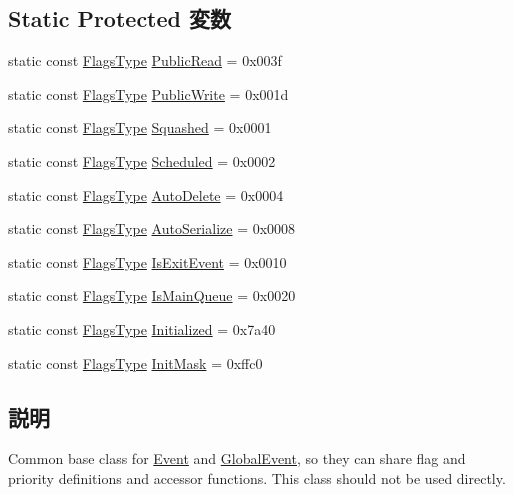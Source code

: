 \subsection*{Static Protected 変数}
\begin{DoxyCompactItemize}
\item 
static const \hyperlink{classEventBase_ad01d22e048b90a29dcd44109f5fc4c5e}{FlagsType} \hyperlink{classEventBase_a7e97bb94f1684b43dd97c646cfdeefd7}{PublicRead} = 0x003f
\item 
static const \hyperlink{classEventBase_ad01d22e048b90a29dcd44109f5fc4c5e}{FlagsType} \hyperlink{classEventBase_afabddde79b1b676b2e1738700aaf08af}{PublicWrite} = 0x001d
\item 
static const \hyperlink{classEventBase_ad01d22e048b90a29dcd44109f5fc4c5e}{FlagsType} \hyperlink{classEventBase_aa538a6b12172092ac14b1c53ed0b5623}{Squashed} = 0x0001
\item 
static const \hyperlink{classEventBase_ad01d22e048b90a29dcd44109f5fc4c5e}{FlagsType} \hyperlink{classEventBase_ac1b50e524ba5bdbd010654eae3ef982b}{Scheduled} = 0x0002
\item 
static const \hyperlink{classEventBase_ad01d22e048b90a29dcd44109f5fc4c5e}{FlagsType} \hyperlink{classEventBase_a54ba74dbb445f08c349fc85154f58b97}{AutoDelete} = 0x0004
\item 
static const \hyperlink{classEventBase_ad01d22e048b90a29dcd44109f5fc4c5e}{FlagsType} \hyperlink{classEventBase_ab0020d618271fa7867d0cf1373b325a9}{AutoSerialize} = 0x0008
\item 
static const \hyperlink{classEventBase_ad01d22e048b90a29dcd44109f5fc4c5e}{FlagsType} \hyperlink{classEventBase_a9d51d37203d97fcdc8bc0141dfc00886}{IsExitEvent} = 0x0010
\item 
static const \hyperlink{classEventBase_ad01d22e048b90a29dcd44109f5fc4c5e}{FlagsType} \hyperlink{classEventBase_a3ab0ae5852588928a5c60a6543a3db49}{IsMainQueue} = 0x0020
\item 
static const \hyperlink{classEventBase_ad01d22e048b90a29dcd44109f5fc4c5e}{FlagsType} \hyperlink{classEventBase_a611b43eb08ae22242d90519aead42966}{Initialized} = 0x7a40
\item 
static const \hyperlink{classEventBase_ad01d22e048b90a29dcd44109f5fc4c5e}{FlagsType} \hyperlink{classEventBase_aafaad8a39b48a0343a743d9ce8a1f977}{InitMask} = 0xffc0
\end{DoxyCompactItemize}


\subsection{説明}
Common base class for \hyperlink{classEvent}{Event} and \hyperlink{classGlobalEvent}{GlobalEvent}, so they can share flag and priority definitions and accessor functions. This class should not be used directly. 

